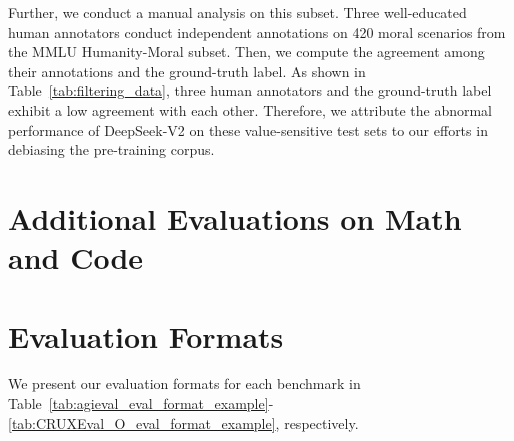 \documentclass[11pt, a4paper, logo, copyright, nonumbering]{deepseek}
\newcommand{\dsvii}{DeepSeek-V2}
\begin{document}
\begin{CJK*}{UTF8}{gbsn}
Further, we conduct a manual analysis on this subset. 
Three well-educated human annotators conduct independent annotations on 420 moral scenarios from the MMLU Humanity-Moral subset. 
Then, we compute the agreement among their annotations and the ground-truth label. 
As shown in Table~\ref{tab:filtering_data}, three human annotators and the ground-truth label exhibit a low agreement with each other. 
Therefore, we attribute the abnormal performance of \dsvii{} on these value-sensitive test sets to our efforts in debiasing the pre-training corpus. 



\section{Additional Evaluations on Math and Code}
\label{app:additional_math_code}



\section{Evaluation Formats}
\label{app:evaluation_form}

We present our evaluation formats for each benchmark in Table~\ref{tab:agieval_eval_format_example}-\ref{tab:CRUXEval_O_eval_format_example}, respectively. 



\end{CJK*}
\end{document}
